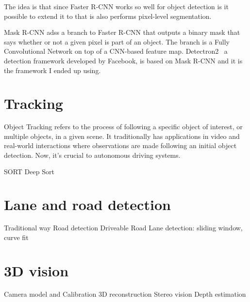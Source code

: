 The idea is that since Faster R-CNN works so well for object detection is it
possible to extend it to that is also performs pixel-level segmentation. 

Mask R-CNN adss a branch to Faster R-CNN that outputs a binary mask that says
whether or not a given pixel is part of an object. The branch is a Fully
Convolutional Network on top of a CNN-based feature map.
Detectron2~\cite{wu2019detectron2} a detection framework developed by Facebook,
is based on Mask R-CNN and it is the framework I ended up using.

\section{Tracking}
Object Tracking refers to the process of following a specific object of
interest, or multiple objects, in a given scene. It traditionally has
applications in video and real-world interactions where observations are made
following an initial object detection. Now, it’s crucial to autonomous driving
systems.

SORT
Deep Sort

\section{Lane and road detection}
Traditional way
Road detection
Driveable Road
Lane detection: sliding window, curve fit


\section{3D vision}
Camera model and Calibration
3D reconstruction
Stereo vision
Depth estimation










